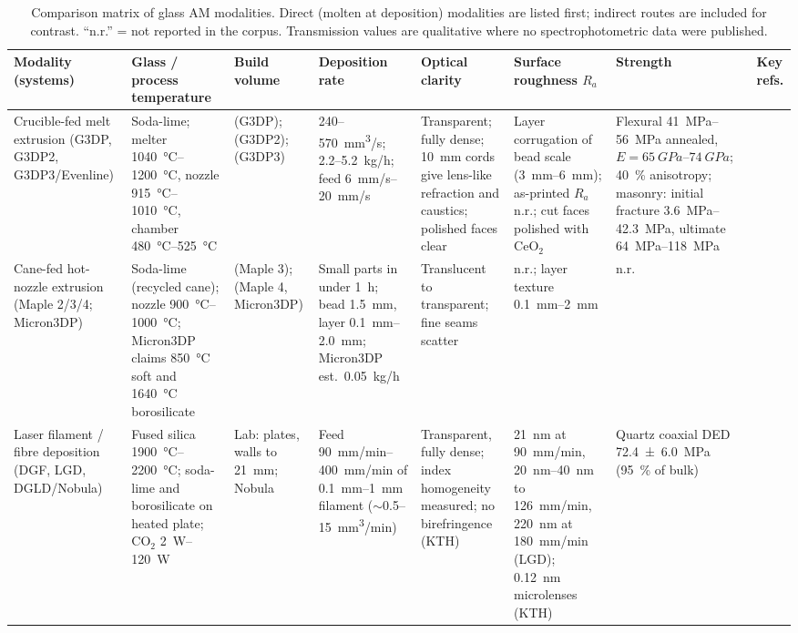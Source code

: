 \begin{table}
  \centering\scriptsize
  \caption{Comparison matrix of glass AM modalities. Direct (molten at deposition) modalities are listed first; indirect routes are included for contrast. ``n.r.'' = not reported in the corpus. Transmission values are qualitative where no spectrophotometric data were published.}
  \label{tab:modalities}
  \begin{tabular}{@{}L{2.6cm}L{2.3cm}L{2.4cm}L{2.5cm}L{2.6cm}L{2.5cm}L{3.0cm}L{2.2cm}@{}}
    \toprule
    Modality (systems) & Glass / process temperature & Build volume & Deposition rate & Optical clarity & Surface roughness \(R_a\) & Strength & Key refs.\\
    \midrule
    Crucible-fed melt extrusion (G3DP, G3DP2, G3DP3/Evenline) & Soda-lime; melter \SIrange{1040}{1200}{\celsius}, nozzle \SIrange{915}{1010}{\celsius}, chamber \SIrange{480}{525}{\celsius} &  (G3DP);  (G3DP2);  (G3DP3) & \SI{240}{}--\SI{570}{mm^3/s}; \SI{2.2}{}--\SI{5.2}{kg/h}; feed \SIrange{6}{20}{mm/s} & Transparent; fully dense; \SI{10}{mm} cords give lens-like refraction and caustics; polished faces clear & Layer corrugation of bead scale (\SIrange{3}{6}{mm}); as-printed \(R_a\) n.r.; cut faces polished with CeO\(_2\) & Flexural \SIrange{41}{56}{MPa} annealed, \(E = \SIrange{65}{74}{GPa}\); \SI{40}{\percent} anisotropy; masonry: initial fracture \SIrange{3.6}{42.3}{MPa}, ultimate \SIrange{64}{118}{MPa} & \citep{klein2015,inamura2018,mit2024masonry,stern2024cgc}\\
    Cane-fed hot-nozzle extrusion (Maple 2/3/4; Micron3DP) & Soda-lime (recycled cane); nozzle \SIrange{900}{1000}{\celsius}; Micron3DP claims \SI{850}{\celsius} soft and \SI{1640}{\celsius} borosilicate &  (Maple 3);  (Maple 4, Micron3DP) & Small parts in under \SI{1}{h}; bead \SI{1.5}{mm}, layer \SIrange{0.1}{2.0}{mm}; Micron3DP est.\ \SI{0.05}{kg/h} & Translucent to transparent; fine seams scatter & n.r.; layer texture \SIrange{0.1}{2}{mm} & n.r. & \citep{maple_ammedia,maple_aniwaa,threednatives2025,micron3dp_acers,inamura2018}\\
    Laser filament / fibre deposition (DGF, LGD, DGLD/Nobula) & Fused silica \SIrange{1900}{2200}{\celsius}; soda-lime and borosilicate on heated plate; CO\(_2\) \SIrange{2}{120}{W} & Lab:  plates, walls to \SI{21}{mm}; Nobula  & Feed \SIrange{90}{400}{mm/min} of \SIrange{0.1}{1}{mm} filament (\(\sim\)\SI{0.5}{}--\SI{15}{mm^3/min}) & Transparent, fully dense; index homogeneity measured; no birefringence (KTH) & \SI{21}{nm} at \SI{90}{mm/min}, \SIrange{20}{40}{nm} to \SI{126}{mm/min}, \SI{220}{nm} at \SI{180}{mm/min} (LGD); \SI{0.12}{nm} microlenses (KTH) & Quartz coaxial DED \SI{72.4 +- 6.0}{MPa} (\SI{95}{\percent} of bulk) & \citep{luo2017sodalime,luo2018quartz,witzendorff2018,lgd2024homog,kth2022bonding,kth2024microlens,lang2024,nobula_aniwaa}\\

\end{tabular}
\end{table}

